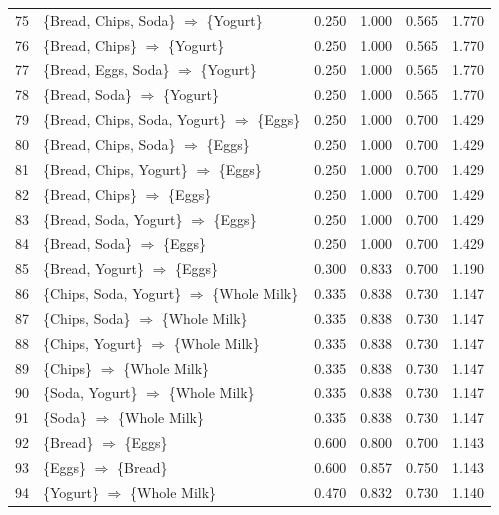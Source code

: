 \documentclass[12pt,letterpaper, onecolumn]{exam}
\begin{document}
\begin{questions}
\begin{solution}
{\begin{longtable}{|c|l|c|c|c|c|}
            75 & \{Bread, Chips, Soda\} $\Rightarrow$ \{Yogurt\} & 0.250 & 1.000 & 0.565 & 1.770 \\
            76 & \{Bread, Chips\} $\Rightarrow$ \{Yogurt\} & 0.250 & 1.000 & 0.565 & 1.770 \\
            77 & \{Bread, Eggs, Soda\} $\Rightarrow$ \{Yogurt\} & 0.250 & 1.000 & 0.565 & 1.770 \\
            78 & \{Bread, Soda\} $\Rightarrow$ \{Yogurt\} & 0.250 & 1.000 & 0.565 & 1.770 \\
            79 & \{Bread, Chips, Soda, Yogurt\} $\Rightarrow$ \{Eggs\} & 0.250 & 1.000 & 0.700 & 1.429 \\
            80 & \{Bread, Chips, Soda\} $\Rightarrow$ \{Eggs\} & 0.250 & 1.000 & 0.700 & 1.429 \\
            81 & \{Bread, Chips, Yogurt\} $\Rightarrow$ \{Eggs\} & 0.250 & 1.000 & 0.700 & 1.429 \\
            82 & \{Bread, Chips\} $\Rightarrow$ \{Eggs\} & 0.250 & 1.000 & 0.700 & 1.429 \\
            83 & \{Bread, Soda, Yogurt\} $\Rightarrow$ \{Eggs\} & 0.250 & 1.000 & 0.700 & 1.429 \\
            84 & \{Bread, Soda\} $\Rightarrow$ \{Eggs\} & 0.250 & 1.000 & 0.700 & 1.429 \\
            85 & \{Bread, Yogurt\} $\Rightarrow$ \{Eggs\} & 0.300 & 0.833 & 0.700 & 1.190 \\
            86 & \{Chips, Soda, Yogurt\} $\Rightarrow$ \{Whole Milk\} & 0.335 & 0.838 & 0.730 & 1.147 \\
            87 & \{Chips, Soda\} $\Rightarrow$ \{Whole Milk\} & 0.335 & 0.838 & 0.730 & 1.147 \\
            88 & \{Chips, Yogurt\} $\Rightarrow$ \{Whole Milk\} & 0.335 & 0.838 & 0.730 & 1.147 \\
            89 & \{Chips\} $\Rightarrow$ \{Whole Milk\} & 0.335 & 0.838 & 0.730 & 1.147 \\
            90 & \{Soda, Yogurt\} $\Rightarrow$ \{Whole Milk\} & 0.335 & 0.838 & 0.730 & 1.147 \\
            91 & \{Soda\} $\Rightarrow$ \{Whole Milk\} & 0.335 & 0.838 & 0.730 & 1.147 \\
            92 & \{Bread\} $\Rightarrow$ \{Eggs\} & 0.600 & 0.800 & 0.700 & 1.143 \\
            93 & \{Eggs\} $\Rightarrow$ \{Bread\} & 0.600 & 0.857 & 0.750 & 1.143 \\
            94 & \{Yogurt\} $\Rightarrow$ \{Whole Milk\} & 0.470 & 0.832 & 0.730 & 1.140 \\

\end{longtable}}
\end{solution}
\end{questions}
\end{document}
